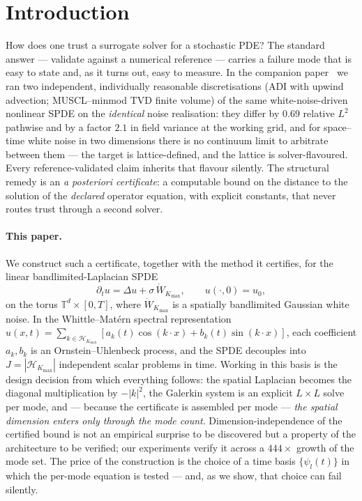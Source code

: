 \section{Introduction}
\label{sec:intro}

How does one trust a surrogate solver for a stochastic PDE? The
standard answer --- validate against a numerical reference --- carries
a failure mode that is easy to state and, as it turns out, easy to
measure. In the companion paper~\cite{paper1} we ran two independent,
individually reasonable discretisations (ADI with upwind advection;
MUSCL--minmod TVD finite volume) of the same white-noise-driven
nonlinear SPDE on the \emph{identical} noise realisation: they differ
by $0.69$ relative $L^2$ pathwise and by a factor $2.1$ in field
variance at the working grid, and for space--time white noise in two
dimensions there is no continuum limit to arbitrate between them ---
the target is lattice-defined, and the lattice is solver-flavoured.
Every reference-validated claim inherits that flavour silently. The
structural remedy is an \emph{a posteriori certificate}: a computable
bound on the distance to the solution of the \emph{declared} operator
equation, with explicit constants, that never routes trust through a
second solver.

\paragraph{This paper.} We construct such a certificate, together with
the method it certifies, for the linear bandlimited-Laplacian SPDE
\begin{equation}
\partial_t u = \Delta u + \sigma\,\dot W_{K_{\max}},
\qquad u(\cdot, 0) = u_0,
\label{eq:lin-spde}
\end{equation}
on the torus $\mathbb{T}^d \times [0, T]$, where $\dot W_{K_{\max}}$ is
a spatially bandlimited Gaussian white noise. In the Whittle--Mat\'ern
spectral representation
$u(x, t) = \sum_{k \in \mathcal{H}_{K_{\max}}}
[a_k(t)\cos(k \cdot x) + b_k(t)\sin(k \cdot x)]$, each coefficient
$a_k, b_k$ is an Ornstein--Uhlenbeck process, and the SPDE decouples
into $J = |\mathcal{H}_{K_{\max}}|$ independent scalar problems in
time. Working in this basis is the design decision from which
everything follows: the spatial Laplacian becomes the diagonal
multiplication by $-|k|^2$, the Galerkin system is an explicit
$L \times L$ solve per mode, and --- because the certificate is
assembled per mode --- \emph{the spatial dimension enters only through
the mode count}. Dimension-independence of the certified bound is not
an empirical surprise to be discovered but a property of the
architecture to be verified; our experiments verify it across a
$444\times$ growth of the mode set. The price of the construction is
the choice of a time basis $\{\psi_l(t)\}$ in which the per-mode
equation is tested --- and, as we show, that choice can fail silently.

